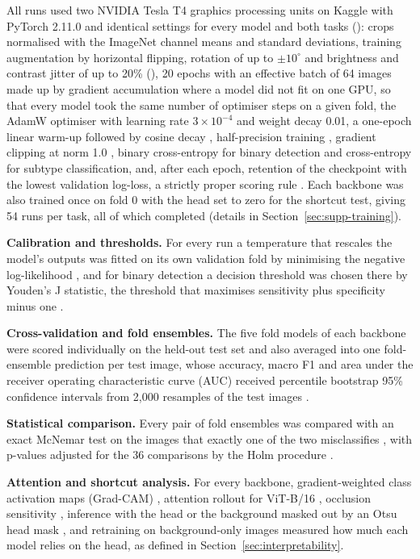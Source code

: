 \documentclass[a4paper,fleqn]{cas-sc}
\begin{document}
All runs used two NVIDIA Tesla T4 graphics processing units on Kaggle with PyTorch 2.11.0 \citep{paszke2019} and identical settings for every model and both tasks (): crops normalised with the ImageNet channel means and standard deviations, training augmentation by horizontal flipping, rotation of up to $\pm 10^{\circ}$ and brightness and contrast jitter of up to 20\% (), 20 epochs with an effective batch of 64 images made up by gradient accumulation where a model did not fit on one GPU, so that every model took the same number of optimiser steps on a given fold, the AdamW optimiser \citep{loshchilov2019} with learning rate $3\times 10^{-4}$ and weight decay 0.01, a one-epoch linear warm-up followed by cosine decay \citep{loshchilov2017}, half-precision training \citep{micikevicius2018}, gradient clipping at norm 1.0 \citep{pascanu2013}, binary cross-entropy for binary detection and cross-entropy for subtype classification, and, after each epoch, retention of the checkpoint with the lowest validation log-loss, a strictly proper scoring rule \citep{gneiting2007}. Each backbone was also trained once on fold 0 with the head set to zero for the shortcut test, giving 54 runs per task, all of which completed (details in Section~\ref{sec:supp-training}).

\textbf{Calibration and thresholds.} For every run a temperature that rescales the model's outputs was fitted on its own validation fold by minimising the negative log-likelihood \citep{guo2017}, and for binary detection a decision threshold was chosen there by Youden's J statistic, the threshold that maximises sensitivity plus specificity minus one \citep{youden1950}.

\textbf{Cross-validation and fold ensembles.} The five fold models of each backbone were scored individually on the held-out test set and also averaged into one fold-ensemble prediction per test image, whose accuracy, macro F1 and area under the receiver operating characteristic curve (AUC) received percentile bootstrap 95\% confidence intervals from 2,000 resamples of the test images \citep{efron1979}.

\textbf{Statistical comparison.} Every pair of fold ensembles was compared with an exact McNemar test on the images that exactly one of the two misclassifies \citep{mcnemar1947}, with p-values adjusted for the 36 comparisons by the Holm procedure \citep{holm1979}.

\textbf{Attention and shortcut analysis.} For every backbone, gradient-weighted class activation maps (Grad-CAM) \citep{selvaraju2017}, attention rollout for ViT-B/16 \citep{abnar2020}, occlusion sensitivity \citep{zeiler2014}, inference with the head or the background masked out by an Otsu head mask \citep{otsu1979}, and retraining on background-only images \citep{geirhos2020} measured how much each model relies on the head, as defined in Section~\ref{sec:interpretability}.
\end{document}
